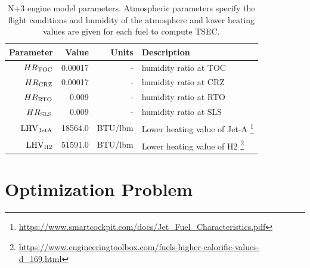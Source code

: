 \documentclass[conf]{new-aiaa}
\begin{document}
\begin{table}[hbt!]
    \centering
    \caption{
        N+3 engine model parameters.
        Atmospheric parameters specify the flight conditions and humidity of the atmosphere and lower heating values are given for each fuel to compute TSEC.}
    \begin{tabular}{r r r l}
        \hline
        Parameter              & Value   & Units        & Description                                                                                                            \\
        \hline
        $HR_{\rm{TOC}}$        & 0.00017 & -            & humidity ratio at TOC \cite{Kalnay1996}                                                                                \\
        $HR_{\rm{CRZ}}$        & 0.00017 & -            & humidity ratio at CRZ \cite{Kalnay1996}                                                                                \\
        $HR_{\rm{RTO}}$        & 0.009   & -            & humidity ratio at RTO \cite{Kalnay1996}                                                                                \\
        $HR_{\rm{SLS}}$        & 0.009   & -            & humidity ratio at SLS \cite{Kalnay1996}                                                                                \\
        $\rm{LHV}_{\rm{JetA}}$ & 18564.0 & \si{BTU/lbm} & Lower heating value of Jet-A \footnote{\url{https://www.smartcockpit.com/docs/Jet_Fuel_Characteristics.pdf}}           \\
        $\rm{LHV}_{\rm{H2}}$   & 51591.0 & \si{BTU/lbm} & Lower heating value of H2 \footnote{\url{https://www.engineeringtoolbox.com/fuels-higher-calorific-values-d_169.html}} \\
        \hline
    \end{tabular}
    \label{engine_params}
\end{table}

\section{Optimization Problem}
\label{sec:optprob}
\end{document}
